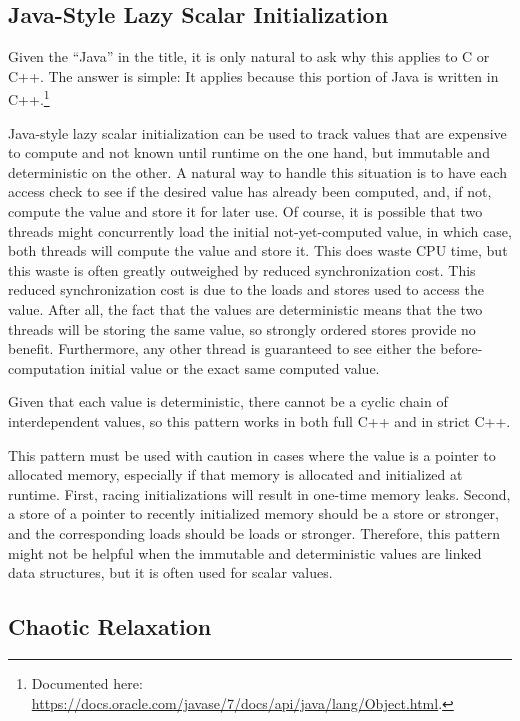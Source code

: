 \documentclass[10]{article}
\begin{document}
\subsection{Java-Style Lazy Scalar Initialization}
\label{sec:Java-Style Lazy Scalar Initialization}

Given the ``Java'' in the title, it is only natural to ask why this
applies to C or C++.
The answer is simple:
It applies because this portion of Java is written in C++.\footnote{
	Documented here:
	\url{https://docs.oracle.com/javase/7/docs/api/java/lang/Object.html}.}

Java-style lazy scalar initialization can be used to track values that
are expensive to compute and not known until runtime on the one hand,
but immutable and deterministic on the other.
A natural way to handle this situation is to have each access check
to see if the desired value has already been computed, and, if not,
compute the value and store it for later use.
Of course, it is possible that two threads might concurrently load
the initial not-yet-computed value, in which case, both threads
will compute the value and store it.
This does waste CPU time, but this waste is often greatly outweighed by
reduced synchronization cost.
This reduced synchronization cost is due to the 
loads and stores used to access the value.
After all, the fact that the values are deterministic means that
the two threads will be storing the same value, so strongly ordered
stores provide no benefit.
Furthermore, any other thread is guaranteed to see either the
before-computation initial value or the exact same computed value.

Given that each value is deterministic, there cannot be a cyclic chain
of interdependent values, so this pattern works in both full C++ and in
strict C++.

This pattern must be used with caution in cases where the value is
a pointer to allocated memory, especially if that memory is allocated
and initialized at runtime.
First, racing initializations will result in one-time memory leaks.
Second, a store of a pointer to recently initialized memory should
be a  store or stronger, and the corresponding
loads should be  loads or stronger.
Therefore, this pattern might not be helpful when the immutable and
deterministic values are linked data structures, but it is often used
for scalar values.

\subsection{Chaotic Relaxation}
\label{sec:Chaotic Relaxation}
\end{document}
